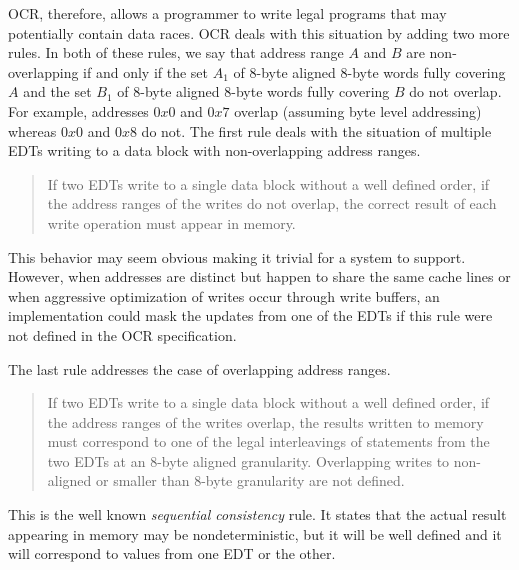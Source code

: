 OCR, therefore, allows a programmer to write legal programs that may
potentially contain data races. OCR deals with this situation by
adding two more rules. In both of these rules, we say that address
range $A$ and $B$ are non-overlapping if and only if the set $A_1$ of
8-byte aligned 8-byte words fully covering $A$ and the set $B_1$ of
8-byte aligned 8-byte words fully covering $B$ do not overlap. For
example, addresses
$0x0$ and $0x7$ overlap (assuming byte level addressing) whereas
$0x0$ and $0x8$ do not.
The first rule deals with the situation of multiple
EDTs writing to a data block with non-overlapping address ranges.
\begin{quote}
If two EDTs write to a single data block without a well defined order,
if the address ranges of the writes do not overlap, the correct result
of each write operation must appear in memory.
\end{quote}

This behavior may seem obvious making it trivial for a system to
support. However, when addresses are distinct but happen to share the
same cache lines or when aggressive optimization of writes occur
through write buffers, an implementation could mask the updates from
one of the EDTs if this rule were not defined in the OCR
specification.

The last rule addresses the case of overlapping address ranges.
\begin{quote}
If two EDTs write to a single data block without a well defined order,
if the address ranges of the writes overlap, the results written to
memory must correspond to one of the legal interleavings of statements
from the two EDTs at an 8-byte aligned granularity. Overlapping writes
to non-aligned or smaller than 8-byte granularity are not defined.
\end{quote}
This is the well known \emph{sequential consistency} rule. It states that the actual result appearing in
memory may be nondeterministic, but it will be well defined and it
will correspond to values from one EDT or the other.
%
%

